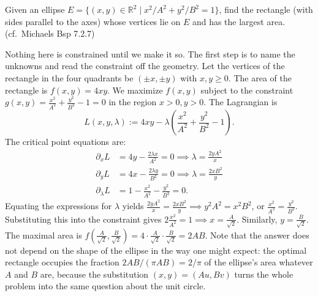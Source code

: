 \begin{example}
\label{ex:largest_rectangle_ellipse}
Given an ellipse $E = \{ (x,y) \in \mathbb{R}^2 \mid x^2/A^2 + y^2/B^2 = 1 \}$, find the rectangle (with sides parallel to the axes) whose vertices lie on $E$ and has the largest area. (cf.\ Michaels Bsp 7.2.7)

\medskip
Nothing here is constrained until we make it so. The first step is to name the unknowns and read
the constraint off the geometry. Let the vertices of the rectangle in the four quadrants be $(\pm x, \pm y)$ with $x, y \geq 0$. The area of the rectangle is $f(x,y) = 4xy$.
We maximize $f(x,y)$ subject to the constraint $g(x,y) = \frac{x^2}{A^2} + \frac{y^2}{B^2} - 1 = 0$ in the region $x > 0, y > 0$.
The Lagrangian is
\[L(x,y,\lambda) := 4xy - \lambda\left(\frac{x^2}{A^2} + \frac{y^2}{B^2} - 1\right).\]
The critical point equations are:
\begin{align*}
  \partial_x L &= 4y - \frac{2\lambda x}{A^2} = 0 \implies \lambda = \frac{2yA^2}{x} \\
  \partial_y L &= 4x - \frac{2\lambda y}{B^2} = 0 \implies \lambda = \frac{2xB^2}{y} \\
  \partial_\lambda L &= 1 - \frac{x^2}{A^2} - \frac{y^2}{B^2} = 0.
\end{align*}
Equating the expressions for $\lambda$ yields $\frac{2yA^2}{x} = \frac{2xB^2}{y} \implies y^2 A^2 = x^2 B^2$, or $\frac{x^2}{A^2} = \frac{y^2}{B^2}$.
Substituting this into the constraint gives $2\frac{x^2}{A^2} = 1 \implies x = \frac{A}{\sqrt{2}}$.
Similarly, $y = \frac{B}{\sqrt{2}}$.
The maximal area is $f\left(\frac{A}{\sqrt{2}}, \frac{B}{\sqrt{2}}\right) = 4 \cdot \frac{A}{\sqrt{2}} \cdot \frac{B}{\sqrt{2}} = 2AB$.
Note that the answer does not depend on the shape of the ellipse in the way one might expect: the
optimal rectangle occupies the fraction $2AB/(\pi AB) = 2/\pi$ of the ellipse's area whatever $A$
and $B$ are, because the substitution $(x,y) = (Au,Bv)$ turns the whole problem into the same
question about the unit circle.
\end{example}



